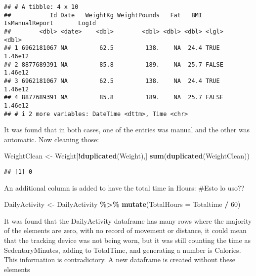 \documentclass[
]{article}
\newenvironment{Shaded}{\begin{snugshade}}{\end{snugshade}}
\newcommand{\AttributeTok}[1]{\textcolor[rgb]{0.13,0.29,0.53}{#1}}
\newcommand{\DecValTok}[1]{\textcolor[rgb]{0.00,0.00,0.81}{#1}}
\newcommand{\FunctionTok}[1]{\textcolor[rgb]{0.13,0.29,0.53}{\textbf{#1}}}
\newcommand{\NormalTok}[1]{#1}
\newcommand{\OtherTok}[1]{\textcolor[rgb]{0.56,0.35,0.01}{#1}}
\newcommand{\SpecialCharTok}[1]{\textcolor[rgb]{0.81,0.36,0.00}{\textbf{#1}}}
\begin{document}
\begin{verbatim}
## # A tibble: 4 x 10
##           Id Date   WeightKg WeightPounds   Fat   BMI IsManualReport       LogId
##        <dbl> <date>    <dbl>        <dbl> <dbl> <dbl> <lgl>                <dbl>
## 1 6962181067 NA         62.5         138.    NA  24.4 TRUE               1.46e12
## 2 8877689391 NA         85.8         189.    NA  25.7 FALSE              1.46e12
## 3 6962181067 NA         62.5         138.    NA  24.4 TRUE               1.46e12
## 4 8877689391 NA         85.8         189.    NA  25.7 FALSE              1.46e12
## # i 2 more variables: DateTime <dttm>, Time <chr>
\end{verbatim}

It was found that in both cases, one of the entries was manual and the
other was automatic. Now cleaning those:

\begin{Shaded}
\begin{Highlighting}[]
\NormalTok{WeightClean }\OtherTok{\textless{}{-}}\NormalTok{ Weight[}\SpecialCharTok{!}\FunctionTok{duplicated}\NormalTok{(Weight),]}
\FunctionTok{sum}\NormalTok{(}\FunctionTok{duplicated}\NormalTok{(WeightClean))}
\end{Highlighting}
\end{Shaded}

\begin{verbatim}
## [1] 0
\end{verbatim}

An additional column is added to have the total time in Hours: \#Esto lo
uso??

\begin{Shaded}
\begin{Highlighting}[]
\NormalTok{DailyActivity }\OtherTok{\textless{}{-}}\NormalTok{ DailyActivity }\SpecialCharTok{\%\textgreater{}\%}
\FunctionTok{mutate}\NormalTok{(}\AttributeTok{TotalHours =}\NormalTok{ Totaltime }\SpecialCharTok{/} \DecValTok{60}\NormalTok{)}
\end{Highlighting}
\end{Shaded}

It was found that the DailyActivity dataframe has many rows where the
majority of the elements are zero, with no record of movement or
distance, it could mean that the tracking device was not being worn, but
it was still counting the time as SedentaryMinutes, adding to TotalTime,
and generating a number is Calories. This information is contradictory.
A new dataframe is created without these elements
\end{document}
